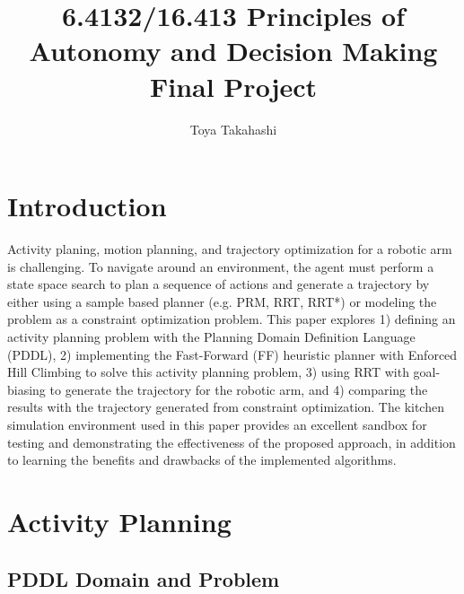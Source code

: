 \documentclass{article}
\title{6.4132/16.413 Principles of Autonomy and Decision Making Final Project}
\author[ ]{Toya Takahashi}
\affil[ ]{Massachusetts Institute of Technology}
\affil[ ]{Department of Aeronautics and Astronautics}
\begin{document}
\maketitle

\section{Introduction}

Activity planing, motion planning, and trajectory optimization for a robotic arm is challenging. To navigate around an environment, the agent must perform a state space search to plan a sequence of actions and generate a trajectory by either using a sample based planner (e.g. PRM, RRT, RRT*) or modeling the problem as a constraint optimization problem. This paper explores 1) defining an activity planning problem with the Planning Domain Definition Language (PDDL), 2) implementing the Fast-Forward (FF) heuristic planner with Enforced Hill Climbing to solve this activity planning problem, 3) using RRT with goal-biasing to generate the trajectory for the robotic arm, and 4) comparing the results with the trajectory generated from constraint optimization. The kitchen simulation environment used in this paper provides an excellent sandbox for testing and demonstrating the effectiveness of the proposed approach, in addition to learning the benefits and drawbacks of the implemented algorithms.

\section{Activity Planning}

\subsection{PDDL Domain and Problem}
\end{document}

